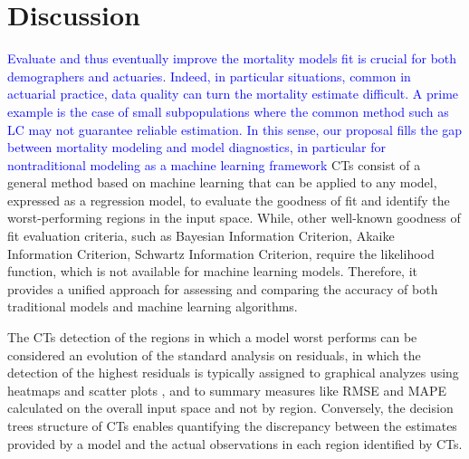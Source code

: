\documentclass[fleqn,10pt]{wlscirep}
\begin{document}
\section*{Discussion}
\textcolor{blue}{Evaluate and thus eventually improve the mortality models fit is crucial for both demographers and actuaries. Indeed, in particular situations, common in actuarial practice, data quality can turn the mortality estimate difficult. A prime example is the case of small subpopulations where the common method such as LC may not guarantee reliable estimation. In this sense, our proposal fills the gap between mortality modeling and model diagnostics, in particular for nontraditional modeling as a machine learning framework }
CTs consist of a general method based on machine learning that can be applied to any model, expressed as a regression model, to evaluate the goodness of fit and identify the worst-performing regions in the input space. While, other well-known goodness of fit evaluation criteria, such as Bayesian Information Criterion, Akaike Information Criterion, Schwartz Information Criterion, require the likelihood function, which is not available for machine learning models. Therefore, it provides a unified approach for assessing and comparing the accuracy of both traditional models and machine learning algorithms.

The CTs detection of the regions in which a model worst performs can be considered an evolution of the standard analysis on residuals, in which the detection of the highest residuals is typically assigned to graphical analyzes using heatmaps and scatter plots \cite{CBD09,Villegas2018}, and to summary measures like RMSE and MAPE calculated on the overall input space and not by region.
Conversely, the decision trees structure of CTs enables quantifying the discrepancy between the estimates provided by a model and the actual observations in each region identified by CTs.
\end{document}
